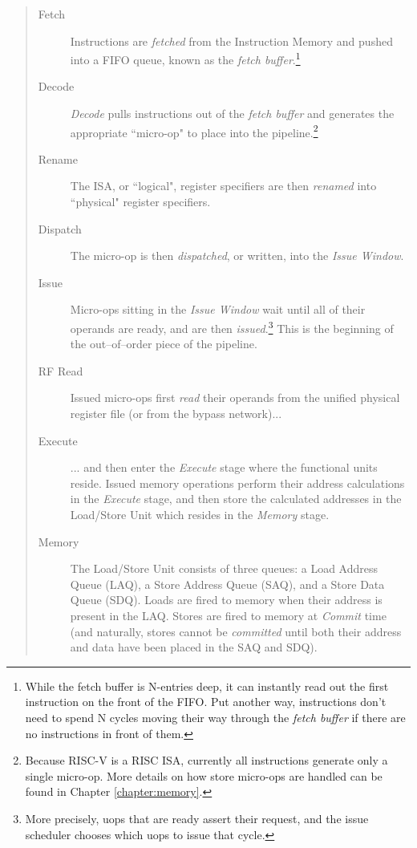 \begin{quote}
\begin{description}
\item[Fetch]  Instructions are {\em fetched} from the Instruction Memory and pushed into a FIFO queue, known as the {\em fetch buffer}.\footnote{While the fetch buffer is N-entries deep, it can instantly read out the first instruction on the front of the FIFO.  Put another way, instructions don't need to spend N cycles moving their way through the {\em fetch buffer} if there are no instructions in front of them.}
\item[Decode]
{\em Decode} pulls instructions out of the {\em fetch buffer} and generates the appropriate ``micro-op" to place into the pipeline.\footnote{Because RISC-V is a RISC ISA, currently all instructions generate only a single micro-op. More details on how store micro-ops are handled can be found in Chapter \ref{chapter:memory}.} 

\item[Rename]
 The ISA, or ``logical", register specifiers are then {\em renamed} into ``physical" register specifiers.
  
\item[Dispatch] The micro-op is then {\em dispatched}, or written, into the {\em Issue Window}.  
 
\item[Issue]   Micro-ops sitting in the {\em Issue Window} wait until all of their operands are ready, and are then {\em issued}.\footnote{More precisely, uops that are ready assert their request, and the issue scheduler chooses which uops to issue that cycle.}  This is the beginning of the out--of--order piece of the pipeline.
\item[RF Read]  Issued micro-ops first {\em read} their operands from the unified physical register file (or from the bypass network)... 
\item[Execute] ... and then enter the {\em Execute} stage where the functional units reside.  Issued memory operations perform their address calculations in the {\em Execute} stage, and then store the calculated addresses in the Load/Store Unit which resides in the {\em Memory} stage.  
 
\item[Memory]  The Load/Store Unit consists of three queues: a Load Address Queue (LAQ), a Store Address Queue (SAQ), and a Store Data Queue (SDQ).  Loads are fired to memory when their address is present in the LAQ. Stores are fired to memory at {\em Commit} time (and naturally, stores cannot be {\em committed} until both their address and data have been placed in the SAQ and SDQ).
 

\end{description}
\end{quote}
